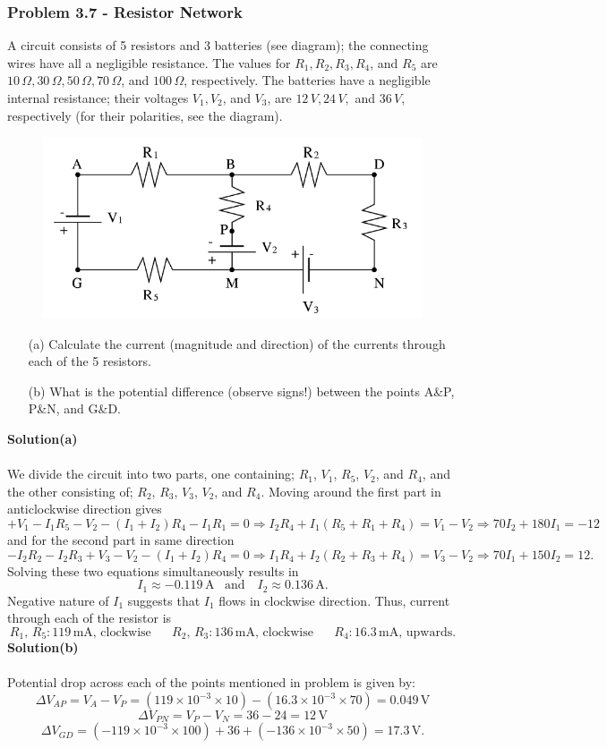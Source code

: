\documentclass{article}
\begin{document}
\subsubsection*{Problem 3.7 - Resistor Network}
A circuit consists of 5 resistors and 3 batteries (see diagram); the connecting wires have all a negligible resistance. The values for $R_1, R_2, R_3, R_4$, and $R_5$ are $10\,\Omega, 30\,\Omega, 50\,\Omega, 70\,\Omega$, and $100\,\Omega$, respectively. The batteries have a negligible internal resistance; their voltages $V_1, V_2$, and $V_3$, are $12\,V, 24\,V,$ and $36\,V$, respectively (for their polarities, see the diagram).
\begin{figure}[h]
    \centering
    \includegraphics[width=0.5\linewidth]{figs/fig_prob_3.7.png}
\end{figure}
 \begin{enumerate}
     \item[(a)]Calculate the current (magnitude and direction) of the currents through each of the 5 resistors.
     \item[(b)]What is the potential difference (observe signs!) between the points A\&P, P\&N, and G\&D.
 \end{enumerate}
 \textbf{Solution(a)}
 \\
 \\We divide the circuit into two parts, one containing; $R_1$, $V_1$, $R_5$, $V_2$, and $R_4$, and the other consisting of; $R_2$, $R_3$, $V_3$, $V_2$, and $R_4$. Moving around the first part in anticlockwise direction gives
 \[+V_1-I_1R_5-V_2-(I_1+I_2)R_4-I_1R_1=0\Rightarrow I_2R_4+I_1(R_5+R_1+R_4)=V_1-V_2\Rightarrow 70I_2+180I_1=-12\]
 and for the second part in same direction
 \[-I_2R_2-I_2R_3+V_3-V_2-(I_1+I_2)R_4=0\Rightarrow I_1R_4+I_2(R_2+R_3+R_4)=V_3-V_2\Rightarrow 70I_1+150I_2=12.\]
 Solving these two equations simultaneously results in
 \[I_1\approx-0.119\,\text{A}\,\,\,\,\,\text{and}\,\,\,\,\,\,I_2\approx0.136\,\text{A}.\]
 Negative nature of $I_1$ suggests that $I_1$ flows in clockwise direction. Thus, current through each of the resistor is
 \[R_1,\,R_5: 119\,\text{mA, clockwise}\,\,\,\,\,\,\,\,\,\,R_2,\,R_3: 136\,\text{mA, clockwise}\,\,\,\,\,\,\,\,\,\,R_4: 16.3\,\text{mA, upwards}.\]
 \textbf{Solution(b)}
 \\
 \\Potential drop across each of the points mentioned in problem is given by:
 \[\Delta V_{AP}=V_A-V_P=(119\times10^{-3}\times10)-(16.3\times10^{-3}\times70)=0.049\,\text{V}\]
 \[\Delta V_{PN}=V_P-V_N=36-24=12\,\text{V}\]
 \[\Delta V_{GD}=(-119\times10^{-3}\times100)+36+(-136\times10^{-3}\times50)=17.3\,\text{V}.\]
\end{document}
